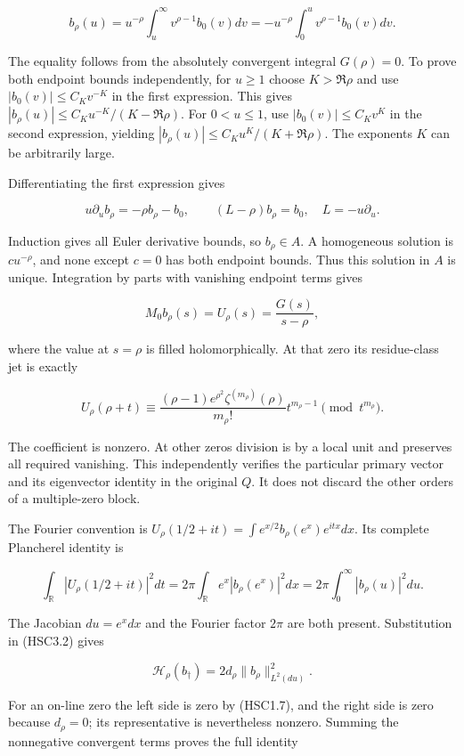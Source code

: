 \[
 b_\rho(u)=u^{-\rho}\int_u^\infty v^{\rho-1}b_0(v)dv
 =-u^{-\rho}\int_0^u v^{\rho-1}b_0(v)dv.
\tag{HSC4.1}
\]

The equality follows from the absolutely convergent integral
\(G(\rho)=0\). To prove both endpoint bounds independently, for
\(u\ge1\) choose \(K>\Re\rho\) and use \(|b_0(v)|\le C_Kv^{-K}\) in the
first expression. This gives \(|b_\rho(u)|\le C_Ku^{-K}/(K-\Re\rho)\).
For \(0<u\le1\), use \(|b_0(v)|\le C_Kv^K\) in the second expression,
yielding \(|b_\rho(u)|\le C_Ku^K/(K+\Re\rho)\). The exponents \(K\) can
be arbitrarily large.

Differentiating the first expression gives

\[
 u\partial_u b_\rho=-\rho b_\rho-b_0,\qquad
 (L-\rho)b_\rho=b_0,\quad L=-u\partial_u.
\tag{HSC4.2}
\]

Induction gives all Euler derivative bounds, so \(b_\rho\in A\). A
homogeneous solution is \(c u^{-\rho}\), and none except \(c=0\) has
both endpoint bounds. Thus this solution in \(A\) is unique. Integration
by parts with vanishing endpoint terms gives

\[
 M_0b_\rho(s)=U_\rho(s)=\frac{G(s)}{s-\rho},
\tag{HSC4.3}
\]

where the value at \(s=\rho\) is filled holomorphically. At that zero
its residue-class jet is exactly

\[
 U_\rho(\rho+t)\equiv
 \frac{(\rho-1)e^{\rho^2}\zeta^{(m_\rho)}(\rho)}{m_\rho!}
 t^{m_\rho-1}\pmod{t^{m_\rho}}.
\tag{HSC4.4}
\]

The coefficient is nonzero. At other zeros division is by a local unit
and preserves all required vanishing. This independently verifies the
particular primary vector and its eigenvector identity in the original
\(Q\). It does not discard the other orders of a multiple-zero block.

The Fourier convention is
\(U_\rho(1/2+it)=\int e^{x/2}b_\rho(e^x)e^{itx}dx\). Its complete
Plancherel identity is

\[
 \int_{\mathbb R}|U_\rho(1/2+it)|^2dt
 =2\pi\int_{\mathbb R}e^x|b_\rho(e^x)|^2dx
 =2\pi\int_0^\infty|b_\rho(u)|^2du.
\tag{HSC4.5}
\]

The Jacobian \(du=e^x dx\) and the Fourier factor \(2\pi\) are both
present. Substitution in (HSC3.2) gives

\[
 \mathcal H_\rho(b_\dagger)=2d_\rho\|b_\rho\|_{L^2(du)}^2.
\tag{HSC4.6}
\]

For an on-line zero the left side is zero by (HSC1.7), and the right
side is zero because \(d_\rho=0\); its representative is nevertheless
nonzero. Summing the nonnegative convergent terms proves the full
identity


